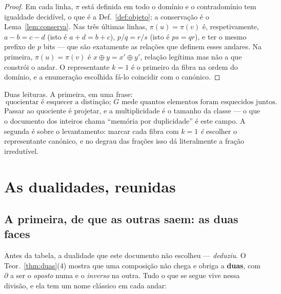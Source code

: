 \documentclass[11pt,a4paper]{article}
\begin{document}
\begin{proof}
Em cada linha, $\pi$ está definida em todo o domínio e o contradomínio tem
igualdade decidível, o que é a Def.~\ref{def:objeto}; a conservação é o
Lema~\ref{lem:conserva}. Nas três últimas linhas, $\pi(u)=\pi(v)$ é,
respetivamente, $a-b=c-d$ (isto é $a+d=b+c$), $p/q=r/s$ (isto é $ps=qr$), e ter
o mesmo prefixo de $p$ bits --- que são exatamente as relações que definem esses
andares. Na primeira, $\pi(u)=\pi(v)$ é $x\oplus y=x'\oplus y'$, relação
legítima mas não a que constrói o andar. O representante $k=1$ é o primeiro da
fibra na ordem do domínio, e a enumeração escolhida fá-lo coincidir com o
canónico.
\end{proof}

\medskip\noindent Duas leituras. A primeira, em uma frase:
\[
\boxed{\ \text{quocientar é esquecer a distinção; }G\text{ mede quantos elementos
foram esquecidos juntos.}\ }
\]
Passar ao quociente é projetar, e a multiplicidade é o tamanho da classe --- o
que o documento dos inteiros chama ``memória por duplicidade'' é este campo. A segunda é sobre o
levantamento: marcar cada fibra com $k=1$ \emph{é} escolher o representante
canónico, e no degrau das frações isso dá literalmente a fração irredutível.

\section{As dualidades, reunidas}\label{sec:dualidades}

\subsection*{A primeira, de que as outras saem: as duas faces}

\noindent Antes da tabela, a dualidade que este documento não escolheu ---
\emph{deduziu}. O Teor.~\ref{thm:duas}(4) mostra que uma composição não chega e
obriga a \textbf{duas}, com $\partial$ a ser o \emph{oposto} numa e o
\emph{inverso} na outra. Tudo o que se segue vive nessa divisão, e ela tem um
nome clássico em cada andar:
\end{document}
